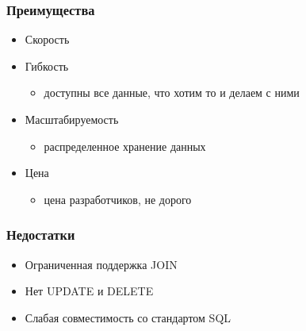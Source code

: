 \documentclass[xetex,mathserif,serif]{beamer}
\begin{document}
\begin{frame}
	\frametitle{Преимущества}

	\begin{itemize}
		\item Скорость
		\item Гибкость
            \begin{itemize}
                \item доступны все данные, что хотим то и делаем с ними
            \end{itemize}
		\item Масштабируемость
            \begin{itemize}
                \item распределенное хранение данных
            \end{itemize}
		\item Цена 
            \begin{itemize}
                \item цена разработчиков, не дорого
            \end{itemize}
	\end{itemize}
\end{frame}


\begin{frame}
	\frametitle{Недостатки}

	\begin{itemize}
		\item Ограниченная поддержка JOIN
		\item Нет UPDATE и DELETE
		\item Слабая совместимость со стандартом SQL
	\end{itemize}
\end{frame}





\end{document}
